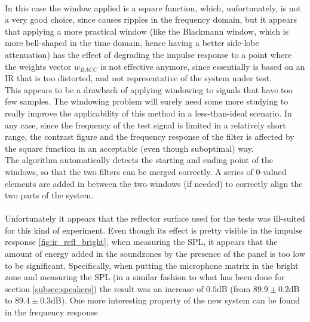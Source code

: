 \\
In this case the window applied is a square function, which, unfortunately, is not a very good choice, since causes ripples in the frequency domain, but it appears that applying a more practical window (like the Blackmann window, which is more bell-shaped in the time domain, hence having a better side-lobe attenuation) has the effect of degrading the impulse response to a point where the weights vector $w_{BACC}$ is not effective anymore, since essentially is based on an IR that is too distorted, and not representative of the system under test.
\\
This appears to be a drawback of applying windowing to signals that have too few samples. The windowing problem will surely need some more studying to really improve the applicability of this method in a less-than-ideal scenario. In any case, since the frequency of the test signal is limited in a relatively short range, the contrast figure and the frequency response of the filter is affected by the square function in an acceptable (even though suboptimal) way. 
\\
The algorithm automatically detects the starting and ending point of the windows, so that the two filters can be merged correctly. A series of 0-valued elements are added in between the two windows (if needed) to correctly align the two parts of the system.
\\
\\
Unfortunately it appears that the reflector surface used for the tests was ill-suited for this kind of experiment. Even though its effect is pretty visible in the impulse response \ref{fig:ir_refl_bright}, when measuring the SPL, it appears that the amount of energy added in the soundzones by the presence of the panel is too low to be significant. Specifically, when putting the microphone matrix in the bright zone and measuring the SPL (in a similar fashion to what has been done for section \ref{subsec:speakers}) the result was an increase of $0.5$dB (from $89.9\pm0.2$dB to $89.4\pm0.3$dB). One more interesting property of the new system can be found in the frequency response

